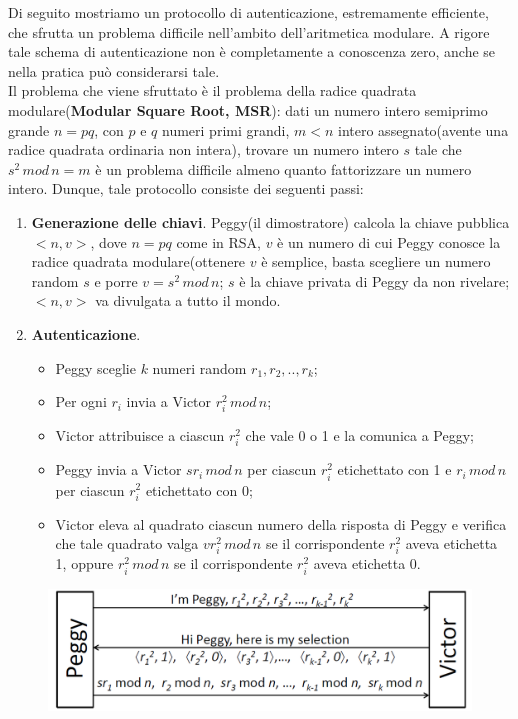 Di seguito mostriamo un protocollo di autenticazione, estremamente efficiente, che sfrutta un problema difficile nell'ambito dell'aritmetica modulare. A rigore tale schema di autenticazione non è
completamente a conoscenza zero, anche se nella pratica può considerarsi tale. \\
Il problema che viene sfruttato è il problema della radice quadrata modulare(\textbf{Modular Square Root, MSR}): dati un numero intero semiprimo grande $n=pq$, con $p$ e $q$ numeri primi grandi, $m<n$ intero assegnato(avente una radice quadrata ordinaria non intera), trovare un numero intero $s$ tale che $s^2 \, mod \, n=m$ è un problema difficile almeno quanto fattorizzare un numero intero.
Dunque, tale protocollo consiste dei seguenti passi: \begin{enumerate}
\item \textbf{Generazione delle chiavi}. Peggy(il dimostratore) calcola la chiave pubblica $<n,v>$, dove $n=pq$ come in RSA, $v$ è un numero di cui Peggy conosce la radice quadrata modulare(ottenere $v$ è semplice, basta scegliere un numero random $s$ e porre $v = s^2 \, mod \, n$; $s$ è la chiave privata di Peggy da non rivelare; $<n,v>$ va divulgata a tutto il mondo.
\item \textbf{Autenticazione}. \begin{itemize}
\item Peggy sceglie $k$ numeri random $r_{1},r_{2},..,r_{k}$;
\item Per ogni $r_{i}$ invia a Victor $r_{i}^2 \, mod \, n$;
\item Victor attribuisce a ciascun $r_{i}^2$ che vale 0 o 1 e la comunica a Peggy;
\item Peggy invia a Victor $sr_{i} \, mod \, n$ per ciascun $r_{i}^2$ etichettato con 1 e $r_{i} \, mod \, n$ per ciascun $r_{i}^2$ etichettato con 0;
\item Victor eleva al quadrato ciascun numero della risposta di Peggy e verifica che tale quadrato valga $vr_{i}^2 \, mod \, n$ se il corrispondente $r_{i}^2$ aveva etichetta 1, oppure $r_{i}^2 \, mod \, n$ se il corrispondente $r_{i}^2$ aveva etichetta 0.
\end{itemize}
\end{enumerate}
\begin{figure}[htbp]
	\centering%
	\subfigure%
	{\includegraphics[scale=0.6, keepaspectratio]{Immagini/Capitolo6/zkasmsr_auth.png}}
	\caption{}
\end{figure}

